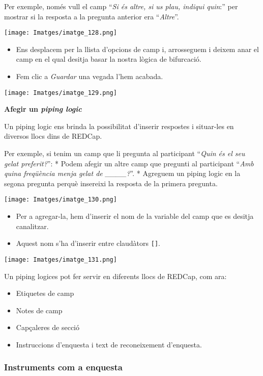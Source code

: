 \documentclass[
]{article}
\providecommand{\tightlist}{%
  \setlength{\itemsep}{0pt}\setlength{\parskip}{0pt}}
\begin{document}
Per exemple, només vull el camp ``\emph{Si és altre, si us plau, indiqui quin}:'' per mostrar si la resposta a la pregunta anterior era ``\emph{Altre}''.

\texttt{[image: Imatges/imatge\_128.png]}

\begin{itemize}
\tightlist
\item
  Ens desplacem per la llista d'opcions de camp i, arrosseguem i deixem anar el camp en el qual desitja basar la nostra lògica de bifurcació.
\item
  Fem clic a \emph{Guardar} una vegada l'hem acabada.
\end{itemize}

\texttt{[image: Imatges/imatge\_129.png]}

\textbf{Afegir un \emph{piping logic}}

Un piping logic ens brinda la possibilitat d'inserir respostes i situar-les en diversos llocs dins de REDCap.

Per exemple, si tenim un camp que li pregunta al participant ``\emph{Quin és el seu gelat preferit?}'':
* Podem afegir un altre camp que pregunti al participant ``\emph{Amb quina freqüència menja gelat de \_\_\_\_?}''.
* Agreguem un piping logic en la segona pregunta perquè insereixi la resposta de la primera pregunta.

\texttt{[image: Imatges/imatge\_130.png]}

\begin{itemize}
\tightlist
\item
  Per a agregar-la, hem d'inserir el nom de la variable del camp que es desitja canalitzar.
\item
  Aquest nom s'ha d'inserir entre claudàtors \texttt{{[}{]}}.
\end{itemize}

\texttt{[image: Imatges/imatge\_131.png]}

Un piping logices pot fer servir en diferents llocs de REDCap, com ara:

\begin{itemize}
\tightlist
\item
  Etiquetes de camp
\item
  Notes de camp
\item
  Capçaleres de secció
\item
  Instruccions d'enquesta i text de reconeixement d'enquesta.
\end{itemize}

\hypertarget{instruments-com-a-enquesta}{%
\subsubsection{\texorpdfstring{\textbf{Instruments com a enquesta}}{Instruments com a enquesta}}\label{instruments-com-a-enquesta}}
\end{document}
